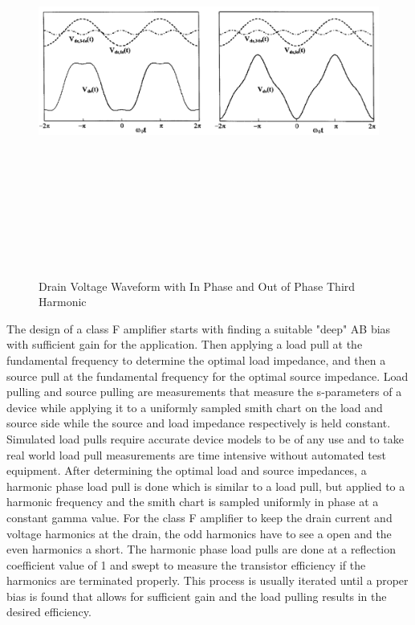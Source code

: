 \begin{figure}
  \centering
  \includegraphics[width=5in,height=5in,keepaspectratio]{figures/detail/third_harmonic_phase}\\
  \caption{Drain Voltage Waveform with In Phase and Out of Phase Third Harmonic \cite{Colantonio1998}}
  \label{fig:third_harmonic_phase}
\end{figure}

The design of a class F amplifier starts with finding a suitable "deep" AB bias with sufficient gain for the application. Then applying a load pull at the fundamental frequency to determine the optimal load impedance, and then a source pull at the fundamental frequency for the optimal source impedance. Load pulling and source pulling are measurements that measure the s-parameters of a device while applying it to a uniformly sampled smith chart on the load and source side while the source and load impedance respectively is held constant. Simulated load pulls require accurate device models to be of any use and to take real world load pull measurements are time intensive without automated test equipment. After determining the optimal load and source impedances, a harmonic phase load pull is done which is similar to a load pull, but applied to a harmonic frequency and the smith chart is sampled uniformly in phase at a constant gamma value. For the class F amplifier to keep the drain current and voltage harmonics at the drain, the odd harmonics have to see a open and the even harmonics a short.%
The harmonic phase load pulls are done at a reflection coefficient value of 1 and swept to measure the transistor efficiency if the harmonics are terminated properly. This process is usually iterated until a proper bias is found that allows for sufficient gain and the load pulling results in the desired efficiency.

